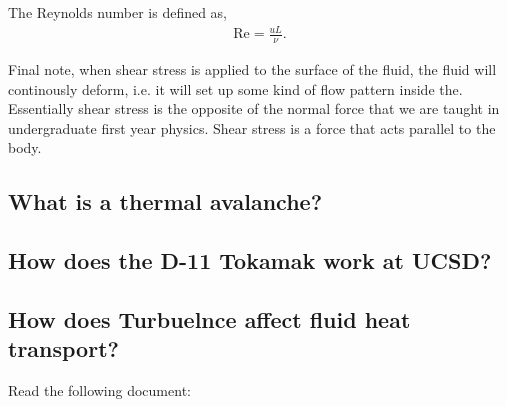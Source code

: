 The Reynolds number is defined as, 
\begin{align}
	\text{Re} = \frac{u L}{\nu}.
\end{align}

Final note, when shear stress is applied to the surface of the fluid, the fluid will continously deform, i.e. it will set up some kind of flow pattern inside the. Essentially shear stress is the opposite of the normal force that we are taught in undergraduate first year physics. Shear stress is a force that acts parallel to the body.

\subsection{What is a thermal avalanche?}

\subsection{How does the D-11 Tokamak work at UCSD?}

\subsection{How does Turbuelnce affect fluid heat transport?}
Read the following document: \cite{1992ApJ...388...64W}
 
